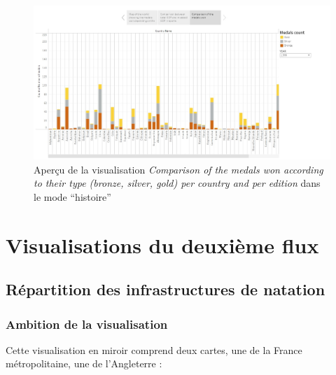 \documentclass[hidelinks, 12pt]{report}
\begin{document}
\begin{center}
	\begin{figure}[H]
		\centering
		\setlength{\belowcaptionskip}{-35pt}
		\includegraphics[scale=0.3]{images/datavis-medals-world-histo-story.jpeg}
		\captionsetup{justification=centering}
		\caption{Aperçu de la visualisation \textit{Comparison of the medals won according to their type (bronze, silver, gold) per country and per edition} dans le mode \enquote{histoire}}
	\end{figure}
\end{center}





%





\section{Visualisations du deuxième flux}

\subsection{Répartition des infrastructures de natation}

\subsubsection{Ambition de la visualisation}

Cette visualisation en miroir comprend deux cartes, une de la France métropolitaine, une de l'Angleterre :
\end{document}

